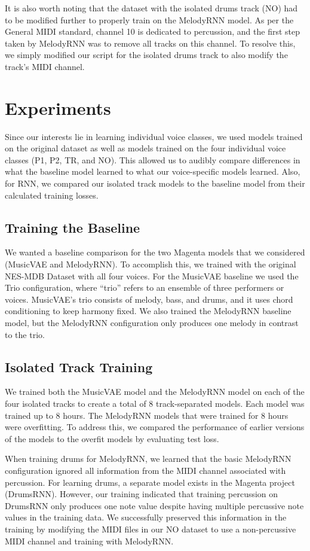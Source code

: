 \documentclass{article}
\begin{document}
It is also worth noting that the dataset with the isolated drums track (NO) had to be modified further to properly train on the MelodyRNN model. As per the General MIDI standard, channel 10 is dedicated to percussion, and the first step taken by MelodyRNN was to remove all tracks on this channel. To resolve this, we simply modified our script for the isolated drums track to also modify the track’s MIDI channel.



\section{Experiments}

Since our interests lie in learning individual voice classes, we used models trained on the original dataset as well as models trained on the four individual voice classes (P1, P2, TR, and NO). This allowed us to audibly compare differences in what the baseline model learned to what our voice-specific models learned. Also, for RNN, we compared our isolated track models to the baseline model from their calculated training losses.

\subsection{Training the Baseline}
We wanted a baseline comparison for the two Magenta models that we considered (MusicVAE and MelodyRNN). To accomplish this, we trained with the original NES-MDB Dataset with all four voices. For the MusicVAE baseline we used the Trio configuration, where “trio” refers to an ensemble of three performers or voices. MusicVAE’s trio consists of melody, bass, and drums, and it uses chord conditioning to keep harmony fixed. We also trained the MelodyRNN baseline model, but the MelodyRNN configuration only produces one melody in contrast to the trio.

\subsection{Isolated Track Training}
We trained both the MusicVAE model and the MelodyRNN model on each of the four isolated tracks to create a total of 8 track-separated models. Each model was trained up to 8 hours. The MelodyRNN models that were trained for 8 hours were overfitting. To address this, we compared the performance of earlier versions of the models to the overfit models by evaluating test loss.

When training drums for MelodyRNN, we learned that the basic MelodyRNN configuration ignored all information from the MIDI channel associated with percussion. For learning drums, a separate model exists in the Magenta project (DrumsRNN). However, our training indicated that training percussion on DrumsRNN only produces one note value despite having multiple percussive note values in the training data. We successfully preserved this information in the training by modifying the MIDI files in our NO dataset to use a non-percussive MIDI channel and training with MelodyRNN.
\end{document}
